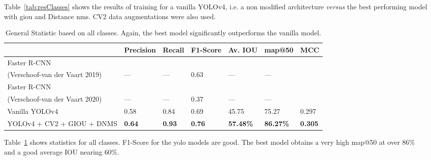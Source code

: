 Table~\ref{tab:resClasses} shows the results of training for a vanilla YOLOv4, i.e. a non modified architecture \textit{versus} the best performing model with \gls{giou} and Distance \gls{nms}. CV2 data augmentations were also used.

\begin{table}[h]
	\centering
	\begin{tabular}{@{}lllllll@{}}
		\toprule
			      & Precision     & Recall        & F1-Score      & Av. IOU    & map@50         & MCC \\ \midrule
			      Faster R-CNN\\ (Verschoof-van der Vaart 2019)\cite{wouter2019} & ---           & ---           & 0.63          & ---            & ---            &     \\
			      Faster R-CNN\\ (Verschoof-van der Vaart 2020)\cite{wouter2020} & ---           & ---           & 0.37 & ---            & ---            &     \\
			      Vanilla YOLOv4                & 0.58          & 0.84          & 0.69          & 45.75          & 75.27          &   0.297  \\
			      YOLOv4 + CV2 + GIOU + DNMS    & \textbf{0.64} & \textbf{0.93} & \textbf{0.76} & \textbf{57.48\%} & \textbf{86.27\%} &     \textbf{0.305} \\ \bottomrule
	\end{tabular}
			      \caption{General Statistic based on all classes. Again, the best model significantly outperforms the vanilla model.}
			      \label{tab:resultsGen}
\end{table}

Table~\ref{tab:resultsGen} shows statistics for all classes. F1-Score for the \gls{yolo} models are good. The best model obtains a very high map@50 at over 86\% and a good average IOU nearing 60\%.

